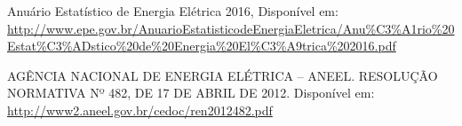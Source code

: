 \par Anuário Estatístico de Energia Elétrica 2016, Disponível em: \url{http://www.epe.gov.br/AnuarioEstatisticodeEnergiaEletrica/Anu%C3%A1rio%20Estat%C3%ADstico%20de%20Energia%20El%C3%A9trica%202016.pdf}
\par AGÊNCIA NACIONAL DE ENERGIA ELÉTRICA – ANEEL. RESOLUÇÃO NORMATIVA Nº 482, DE 17 DE ABRIL DE 2012. Disponível em: \url{http://www2.aneel.gov.br/cedoc/ren2012482.pdf}
